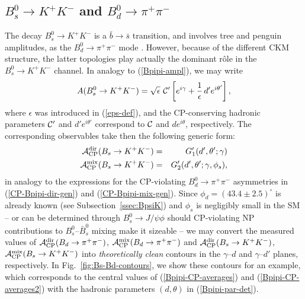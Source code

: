 \documentclass[12pt]{article}
\begin{document}
%
%
%
\boldmath
\subsection{$B^0_s\to K^+K^-$ and $B^0_d\to\pi^+\pi^-$}
\unboldmath
%
%
%
The decay $B^0_s\to K^+K^-$ is a $\bar b \to \bar s$ transition, and
involves tree and penguin amplitudes, as the $B^0_d\to\pi^+\pi^-$ mode 
\cite{RF-BsKK}. However, because of the different CKM structure, the latter 
topologies play actually the dominant r\^ole in the $B^0_s\to K^+K^-$ channel. 
In analogy to (\ref{Bpipi-ampl}), we may write
\begin{equation}\label{BsKK-ampl}
A(B_s^0\to K^+K^-)=\sqrt{\epsilon} \,\, {\cal C}'
\left[e^{i\gamma}+\frac{1}{\epsilon}\,d'e^{i\theta'}\right],
\end{equation}
where $\epsilon$ was introduced in (\ref{eps-def}), and 
the CP-conserving hadronic parameters ${\cal C}'$ and $d'e^{i\theta'}$ 
correspond to ${\cal C}$ and $de^{i\theta}$, respectively. The corresponding
observables take then the following generic form:
\begin{eqnarray}
{\cal A}_{\rm CP}^{\rm dir}(B_s\to K^+K^-)&=&
G_1'(d',\theta';\gamma) \label{CP-BsKK-dir-gen}\\
{\cal A}_{\rm CP}^{\rm mix}(B_s\to K^+K^-)&=&
G_2'(d',\theta';\gamma,\phi_s),\label{CP-BsKK-mix-gen}
\end{eqnarray}
in analogy to the expressions for the CP-violating $B^0_d\to\pi^+\pi^-$
asymmetries in (\ref{CP-Bpipi-dir-gen}) and (\ref{CP-Bpipi-mix-gen}). 
Since $\phi_d=(43.4\pm 2.5)^\circ$ is already known (see
Subsection~\ref{ssec:BpsiK}) and $\phi_s$ is negligibly small
in the SM -- or can be determined through $B^0_s\to J/\psi \phi$ should CP-violating
NP contributions to $B^0_s$--$\bar B^0_s$ mixing make it sizeable -- 
we may convert the measured values of 
${\cal A}_{\rm CP}^{\rm dir}(B_d\to \pi^+\pi^-)$, 
${\cal A}_{\rm CP}^{\rm mix}(B_d\to \pi^+\pi^-)$ and
${\cal A}_{\rm CP}^{\rm dir}(B_s\to K^+K^-)$, 
${\cal A}_{\rm CP}^{\rm mix}(B_s\to K^+K^-)$ into {\it theoretically clean}
contours in the $\gamma$--$d$ and $\gamma$--$d'$ planes, respectively.
In Fig.~\ref{fig:Bs-Bd-contours}, we show these contours for an example,
which corresponds to the central values of (\ref{Bpipi-CP-averages}) and 
(\ref{Bpipi-CP-averages2}) with the hadronic parameters $(d,\theta)$
in (\ref{Bpipi-par-det}). 
\end{document}
